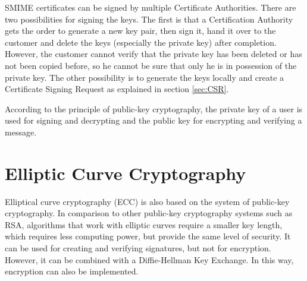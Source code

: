 \documentclass[12pt,oneside,a4paper,parskip]{scrbook}
\begin{document}
SMIME certificates can be signed by multiple Certificate Authorities. There are two possibilities for signing the keys. The first is that a Certification Authority gets the order to generate a new key pair, then sign it, hand it over to the customer and delete the keys (especially the private key) after completion. However, the customer cannot verify that the private key has been deleted or has not been copied before, so he cannot be sure that only he is in possession of the private key. The other possibility is to generate the keys locally and create a Certificate Signing Request as explained in section \ref{sec:CSR}.
\parencite{luber_smime_2018}

According to the principle of public-key cryptography, the private key of a user is used for signing and decrypting and the public key for encrypting and verifying a message.


\section{Elliptic Curve Cryptography}

Elliptical curve cryptography (ECC) is also based on the system of public-key cryptography. In comparison to other public-key cryptography systems such as RSA, algorithms that work with elliptic curves require a smaller key length, which requires less computing power, but provide the same level of security. It can be used for creating and verifying signatures, but not for encryption. However, it can be combined with a Diffie-Hellman Key Exchange. In this way, encryption can also be implemented.
\parencite{hankerson_elliptic_2011}
\end{document}
